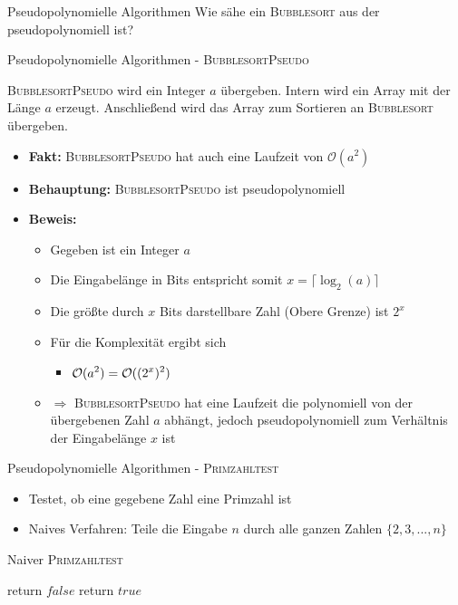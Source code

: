 \begin{frame}{Pseudopolynomielle Algorithmen}
    Wie sähe ein \textsc{Bubblesort} aus der pseudopolynomiell ist?
    
\end{frame}

\begin{frame}{Pseudopolynomielle Algorithmen - \textsc{BubblesortPseudo}}
	
	\textsc{BubblesortPseudo} wird ein Integer $a$ übergeben. Intern wird ein Array mit der Länge $a$ erzeugt. Anschließend wird das Array zum Sortieren an \textsc{Bubblesort} übergeben.
	
	\begin{itemize}
		
		\item \textbf{Fakt:} \textsc{BubblesortPseudo} hat auch eine Laufzeit von $\mathcal{O}(a^2)$
		\item \textbf{Behauptung:} \textsc{BubblesortPseudo} ist pseudopolynomiell
		\pause
		\item \textbf{Beweis:} 
		\begin{itemize}
			\item Gegeben ist ein Integer $a$ 
			\item Die Eingabelänge in Bits entspricht somit $x = \lceil \log_2(a) \rceil$
			\item Die größte durch $x$ Bits darstellbare Zahl (Obere Grenze) ist $2^x$
			\item Für die Komplexität ergibt sich
			\begin{itemize}
				\item $\displaystyle \mathcal{O}(a^2) = \mathcal{O}((2^x)^2)$
			\end{itemize}
			\item[] $\Rightarrow$ \textsc{BubblesortPseudo} hat eine Laufzeit die polynomiell von der übergebenen Zahl $a$ abhängt, jedoch pseudopolynomiell zum Verhältnis der Eingabelänge $x$ ist
		\end{itemize}
	\end{itemize}
\end{frame}

\begin{frame}{Pseudopolynomielle Algorithmen - \textsc{Primzahltest}}
	\begin{itemize}
		\item Testet, ob eine gegebene Zahl eine Primzahl ist
		\item Naives Verfahren: Teile die Eingabe $n$ durch alle ganzen Zahlen $\{2,3,...,n\}$
	\end{itemize}
	
	\begin{algorithm}[H]
		\caption{Naiver \textsc{Primzahltest}}
		\begin{algorithmic}
			\State return $false$
			\EndIf
			\EndFor
			\State return $true$
			\EndFunction
		\end{algorithmic}
	\end{algorithm}
\end{frame}

